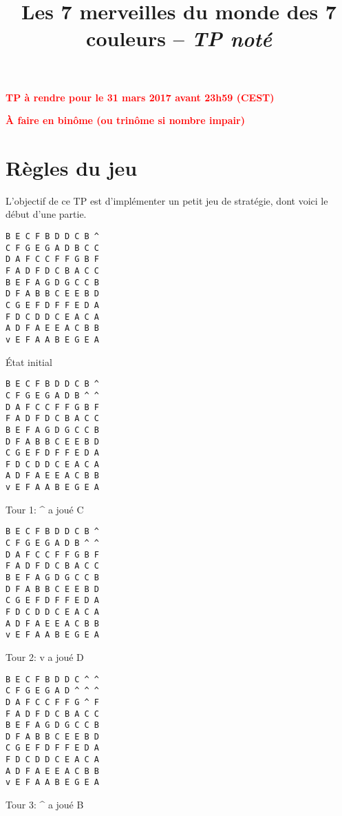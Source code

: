 \documentclass[a4paper,10pt]{article}
\title{Les 7 merveilles du monde des 7 couleurs -- \textit{TP noté}}
\begin{document}
{
\titlebody
\noindent
\bigskip
}
\begin{center}
\textbf{\textcolor{red}{\large TP à rendre pour le 31 mars 2017 avant 23h59 (CEST)}}

\textbf{\textcolor{red}{À faire en binôme (ou trinôme si nombre impair)}}
\end{center}

\section{Règles du jeu}
\label{intro}
L'objectif de ce TP est d'implémenter un petit jeu de stratégie, dont
voici le début d'une partie.

\noindent
  \begin{minipage}[c]{.22\linewidth}
    \begin{lstlisting}
B E C F B D D C B ^ 
C F G E G A D B C C 
D A F C C F F G B F 
F A D F D C B A C C 
B E F A G D G C C B 
D F A B B C E E B D 
C G E F D F F E D A 
F D C D D C E A C A 
A D F A E E A C B B 
v E F A A B E G E A 
    \end{lstlisting}
    \centerline{\'Etat initial}
  \end{minipage}\hfill
  \begin{minipage}[c]{.22\linewidth}
    \begin{lstlisting}
B E C F B D D C B ^ 
C F G E G A D B ^ ^ 
D A F C C F F G B F 
F A D F D C B A C C 
B E F A G D G C C B 
D F A B B C E E B D 
C G E F D F F E D A 
F D C D D C E A C A 
A D F A E E A C B B 
v E F A A B E G E A 
    \end{lstlisting}
    \centerline{Tour 1: \^{} a joué C}
  \end{minipage}\hfill
  \begin{minipage}[c]{.22\linewidth}
    \begin{lstlisting}
B E C F B D D C B ^ 
C F G E G A D B ^ ^ 
D A F C C F F G B F 
F A D F D C B A C C 
B E F A G D G C C B 
D F A B B C E E B D 
C G E F D F F E D A 
F D C D D C E A C A 
A D F A E E A C B B 
v E F A A B E G E A 
\end{lstlisting}
    \centerline{Tour 2: v a joué D}
  \end{minipage}\hfill
   \begin{minipage}[c]{.22\linewidth}
    \begin{lstlisting}
B E C F B D D C ^ ^ 
C F G E G A D ^ ^ ^ 
D A F C C F F G ^ F 
F A D F D C B A C C 
B E F A G D G C C B 
D F A B B C E E B D 
C G E F D F F E D A 
F D C D D C E A C A 
A D F A E E A C B B 
v E F A A B E G E A 
\end{lstlisting}
     \centerline{Tour 3: \^{} a joué B}
   \end{minipage}
\end{document}
